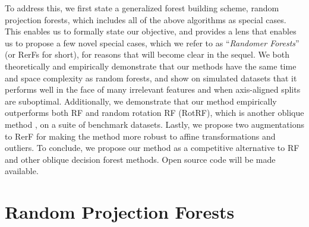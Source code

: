 \documentclass{article}
\begin{document}
To address this, we first state a generalized forest building scheme, random projection forests, which includes all of the above algorithms as special cases. This enables us to formally state our objective, and provides a lens that enables us to propose a few novel special cases, which we refer to as ``{\em{Randomer Forests}}'' (or RerFs for short), for reasons that will become clear in the sequel. We both theoretically and empirically demonstrate that our methods have the same time and space complexity as random forests, and show on simulated datasets that it performs well in the face of many irrelevant features and when axis-aligned splits are suboptimal. Additionally, we demonstrate that our method empirically outperforms both RF and random rotation RF (RotRF), which is another oblique method \cite{Blaser2015}, on a suite of benchmark datasets. Lastly, we propose two augmentations to RerF for making the method more robust to affine transformations and outliers. To conclude, we propose our method as a competitive alternative to RF and other oblique decision forest methods. Open source code will be made available.

\section{Random Projection Forests}
\end{document}

